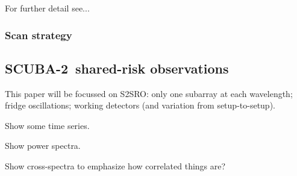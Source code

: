 \documentclass[useAMS,usenatbib,nofootinbib]{mn2e}
\newcommand{\scuba}{SCUBA-2}
\begin{document}
For further detail see...

\subsubsection{Scan strategy}

\subsection{\scuba\ shared-risk observations}

This paper will be focussed on S2SRO: only one subarray at each
wavelength; fridge oscillations; working detectors (and variation from
setup-to-setup).

Show some time series.

Show power spectra.

Show cross-spectra to emphasize how correlated things are?
\end{document}

